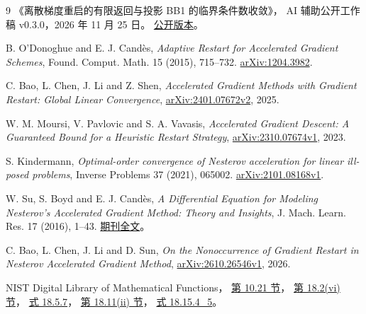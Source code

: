 \documentclass[11pt,a4paper,UTF8,fontset=fandol]{ctexart}
\begin{document}
\begin{thebibliography}{9}
《离散梯度重启的有限返回与投影 BB1 的临界条件数收敛》，
AI 辅助公开工作稿 v0.3.0，2026 年 11 月 25 日。
\href{https://taitai2025.github.io/assets/documents/research/restart-projected-bb.pdf}{公开版本}。

B. O'Donoghue and E. J. Candès,
\emph{Adaptive Restart for Accelerated Gradient Schemes},
Found. Comput. Math. 15 (2015), 715--732.
\href{https://arxiv.org/abs/1204.3982}{arXiv:1204.3982}.

C. Bao, L. Chen, J. Li and Z. Shen,
\emph{Accelerated Gradient Methods with Gradient Restart: Global Linear Convergence},
\href{https://arxiv.org/html/2401.07672v2}{arXiv:2401.07672v2}, 2025.

W. M. Moursi, V. Pavlovic and S. A. Vavasis,
\emph{Accelerated Gradient Descent: A Guaranteed Bound for a Heuristic Restart Strategy},
\href{https://arxiv.org/html/2310.07674v1}{arXiv:2310.07674v1}, 2023.

S. Kindermann,
\emph{Optimal-order convergence of Nesterov acceleration for linear ill-posed problems},
Inverse Problems 37 (2021), 065002.
\href{https://arxiv.org/html/2101.08168v1}{arXiv:2101.08168v1}.

W. Su, S. Boyd and E. J. Candès,
\emph{A Differential Equation for Modeling Nesterov's Accelerated Gradient Method: Theory and Insights},
J. Mach. Learn. Res. 17 (2016), 1--43.
\href{https://jmlr.org/papers/v17/15-084.html}{期刊全文}。

C. Bao, L. Chen, J. Li and D. Sun,
\emph{On the Nonoccurrence of Gradient Restart in Nesterov Accelerated Gradient Method},
\href{https://arxiv.org/html/2610.26546v1}{arXiv:2610.26546v1}, 2026.

NIST Digital Library of Mathematical Functions，
\href{https://dlmf.nist.gov/10.21}{第 10.21 节}，
\href{https://dlmf.nist.gov/18.2.vi}{第 18.2(vi) 节}，
\href{https://dlmf.nist.gov/18.5.E7}{式 18.5.7}，
\href{https://dlmf.nist.gov/18.11.ii}{第 18.11(ii) 节}，
\href{https://dlmf.nist.gov/18.15.E4_5}{式 18.15.4\_5}。
\end{thebibliography}
\end{document}
